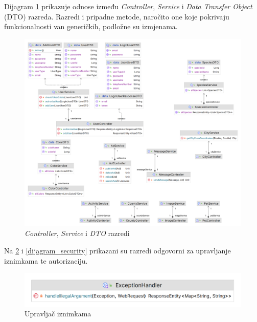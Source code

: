 			Dijagram \ref{dijagram_controller_service_dto} prikazuje odnose između \textit{Controller}, \textit{Service} i \textit{Data Transfer Object} (DTO) razreda. Razredi i pripadne metode, naročito one koje pokrivaju funkcionalnosti van generičkih, podložne su izmjenama.
			
			\begin{figure}[H]
				\includegraphics[scale=0.18]{slike/dijagram_controller_service_dto.PNG} 
				\centering
				\caption{\textit{Controller}, \textit{Service} i \textit{DTO} razredi}
				\label{dijagram_controller_service_dto}
			\end{figure}
			
			Na \ref{dijagram_exception_handler} i \ref{dijagram_security} prikazani su razredi odgovorni za upravljanje iznimkama te autorizaciju.
			
			\begin{figure}[H]
				\includegraphics[scale=0.4]{slike/dijagram_exception_handler.PNG} 
				\centering
				\caption{Upravljač iznimkama}
				\label{dijagram_exception_handler}
			\end{figure}
			
